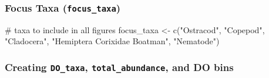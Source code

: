 \documentclass[
  letterpaper,
  DIV=11,
  numbers=noendperiod]{scrartcl}
\newenvironment{Shaded}{\begin{snugshade}}{\end{snugshade}}
\newcommand{\CommentTok}[1]{\textcolor[rgb]{0.37,0.37,0.37}{#1}}
\newcommand{\FunctionTok}[1]{\textcolor[rgb]{0.28,0.35,0.67}{#1}}
\newcommand{\NormalTok}[1]{\textcolor[rgb]{0.00,0.23,0.31}{#1}}
\newcommand{\OtherTok}[1]{\textcolor[rgb]{0.00,0.23,0.31}{#1}}
\newcommand{\StringTok}[1]{\textcolor[rgb]{0.13,0.47,0.30}{#1}}
\begin{document}
\subsubsection{\texorpdfstring{Focus Taxa
(\texttt{focus\_taxa})}{Focus Taxa (focus\_taxa)}}\label{focus-taxa-focus_taxa}

\begin{Shaded}
\begin{Highlighting}[]
\CommentTok{\# taxa to include in all figures}
\NormalTok{focus\_taxa }\OtherTok{\textless{}{-}} \FunctionTok{c}\NormalTok{(}\StringTok{"Ostracod"}\NormalTok{, }\StringTok{"Copepod"}\NormalTok{, }\StringTok{"Cladocera"}\NormalTok{, }
                \StringTok{"Hemiptera Corixidae Boatman"}\NormalTok{, }\StringTok{"Nematode"}\NormalTok{)}
\end{Highlighting}
\end{Shaded}

\subsubsection{\texorpdfstring{Creating \texttt{DO\_taxa},
\texttt{total\_abundance}, and DO
bins}{Creating DO\_taxa, total\_abundance, and DO bins}}\label{creating-do_taxa-total_abundance-and-do-bins}
\end{document}
